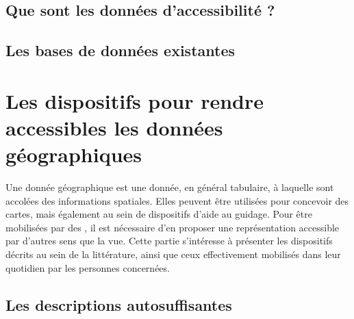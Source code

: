 \todo{}

\subsection{Que sont les données d'accessibilité ?}


\todo{}

\subsection{Les bases de données existantes}



\todo{}

\section{Les dispositifs pour rendre accessibles les données géographiques}


Une donnée géographique est une donnée, en général tabulaire, à laquelle sont accolées des informations spatiales. Elles peuvent être utilisées pour concevoir des cartes, mais également au sein de dispositifs d'aide au guidage. Pour être mobilisées par des \pcdvs, il est nécessaire d'en proposer une représentation accessible par d'autres sens que la vue. Cette partie s'intéresse à présenter les dispositifs décrits au sein de la littérature, ainsi que ceux effectivement mobilisés dans leur quotidien par les personnes concernées.

\subsection{Les descriptions autosuffisantes}

